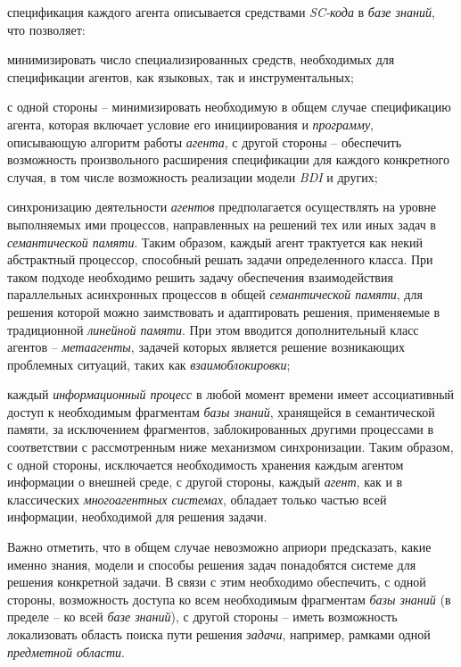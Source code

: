 \begin{textitemize}
\item спецификация каждого агента описывается средствами \textit{SC-кода} в \textit{базе знаний}, что позволяет:
	\begin{textitemize}
	\item минимизировать число специализированных средств, необходимых для спецификации агентов, как языковых, так и инструментальных;
	\item с одной стороны -- минимизировать необходимую в общем случае спецификацию агента, которая включает условие его инициирования и \textit{программу}, описывающую алгоритм работы \textit{агента}, с другой стороны -- обеспечить возможность произвольного расширения спецификации для каждого конкретного случая, в том числе возможность реализации модели \textit{BDI} и других;
	\end{textitemize}
\item синхронизацию деятельности \textit{агентов} предполагается осуществлять на уровне выполняемых ими процессов, направленных на решений тех или иных задач в \textit{семантической памяти}. Таким образом, каждый агент трактуется как некий абстрактный процессор, способный решать задачи определенного класса. При таком подходе необходимо решить задачу обеспечения взаимодействия параллельных асинхронных процессов в общей \textit{семантической памяти}, для решения которой можно заимствовать и адаптировать решения, применяемые в традиционной \textit{линейной памяти}. При этом вводится дополнительный класс агентов -- \textit{метаагенты}, задачей которых является решение возникающих проблемных ситуаций, таких как \textit{взаимоблокировки};
\item каждый \textit{информационный процесс} в любой момент времени имеет ассоциативный доступ к необходимым фрагментам \textit{базы знаний}, хранящейся в семантической памяти, за исключением фрагментов, заблокированных другими процессами в соответствии  с рассмотренным ниже механизмом синхронизации. Таким образом, с одной стороны, исключается необходимость хранения каждым агентом информации о внешней среде, с другой стороны, каждый \textit{агент}, как и в классических \textit{многоагентных системах}, обладает только частью всей информации, необходимой для решения задачи. 
	
Важно отметить, что в общем случае невозможно априори предсказать, какие именно знания, модели и способы решения задач понадобятся системе для решения конкретной задачи. В связи с этим необходимо обеспечить, с одной стороны, возможность доступа ко всем необходимым фрагментам \textit{базы знаний} (в пределе -- ко всей \textit{базе знаний}), с другой стороны -- иметь возможность локализовать область поиска пути решения \textit{задачи}, например, рамками одной \textit{предметной области}.
	

\end{textitemize}
